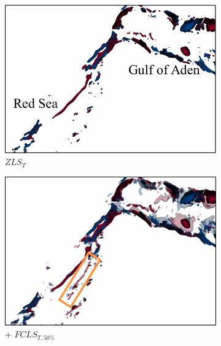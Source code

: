 \begin{figure}[!h]
\begin{subfigure}{0.245\linewidth}
\centering
\includegraphics[width=\linewidth]{Images/RedSeaEddy/zls.pdf}
\vspace{-3mm}
\caption{$ZLS_{T}$}
\label{fig:rse_zls}
\end{subfigure}
\begin{subfigure}{0.245\linewidth}
\centering
\includegraphics[width=\linewidth]{Images/RedSeaEddy/fcls_50.pdf}
\vspace{-3mm}
\caption{+ $FCLS_{T,50\%}$}
\label{fig:rse_fls}
\end{subfigure}
\begin{subfigure}{0.245\linewidth}
\centering

\end{subfigure}
\end{figure}
